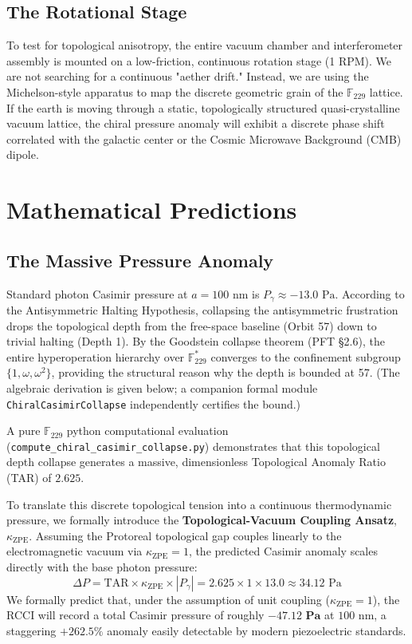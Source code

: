 \documentclass[12pt,oneside]{article}
\theoremstyle{principia}
\theoremstyle{definition}
\theoremstyle{remark}
\begin{document}
\subsection{The Rotational Stage}\label{sec:rotation}
To test for topological anisotropy, the entire vacuum chamber and interferometer assembly is mounted on a low-friction, continuous rotation stage (1 RPM). We are not searching for a continuous "aether drift." Instead, we are using the Michelson-style apparatus to map the discrete geometric grain of the $\mathbb{F}_{229}$ lattice. If the earth is moving through a static, topologically structured quasi-crystalline vacuum lattice, the chiral pressure anomaly will exhibit a discrete phase shift correlated with the galactic center or the Cosmic Microwave Background (CMB) dipole.

\section{Mathematical Predictions}\label{sec:math}

\subsection{The Massive Pressure Anomaly}\label{sec:anomaly}
Standard photon Casimir pressure at $a = 100\text{ nm}$ is $P_\gamma \approx -13.0\text{ Pa}$. 
According to the Antisymmetric Halting Hypothesis, collapsing the antisymmetric frustration drops the topological depth from the free-space baseline (Orbit 57) down to trivial halting (Depth 1). By the Goodstein collapse theorem (PFT \S2.6), the entire hyperoperation hierarchy over $\mathbb{F}_{229}^*$ converges to the confinement subgroup $\{1, \omega, \omega^2\}$, providing the structural reason why the depth is bounded at 57. (The algebraic derivation is given below; a companion formal module \texttt{ChiralCasimirCollapse} independently certifies the bound.)

A pure $\mathbb{F}_{229}$ python computational evaluation (\texttt{compute\_chiral\_casimir\_collapse.py}) demonstrates that this topological depth collapse generates a massive, dimensionless Topological Anomaly Ratio (TAR) of $2.625$.

To translate this discrete topological tension into a continuous thermodynamic pressure, we formally introduce the \textbf{Topological-Vacuum Coupling Ansatz}, $\kappa_{\text{ZPE}}$. Assuming the Protoreal topological gap couples linearly to the electromagnetic vacuum via $\kappa_{\text{ZPE}} = 1$, the predicted Casimir anomaly scales directly with the base photon pressure:
\begin{equation}
    \Delta P = \text{TAR} \times \kappa_{\text{ZPE}} \times |P_\gamma| = 2.625 \times 1 \times 13.0 \approx 34.12\text{ Pa}
\end{equation}
We formally predict that, under the assumption of unit coupling ($\kappa_{\text{ZPE}}=1$), the RCCI will record a total Casimir pressure of roughly $\mathbf{-47.12\text{ Pa}}$ at $100\text{ nm}$, a staggering $+262.5\%$ anomaly easily detectable by modern piezoelectric standards.
\end{document}

